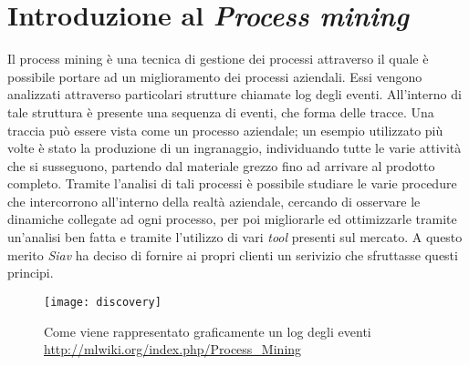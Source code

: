 \section{Introduzione al \textit{Process mining}}
Il process mining è una tecnica di gestione dei processi attraverso il quale è possibile portare ad un miglioramento dei processi aziendali. Essi vengono analizzati attraverso particolari strutture chiamate log degli eventi. All'interno di tale struttura è presente una sequenza di eventi, che forma delle tracce. Una traccia può essere vista come un processo aziendale; un esempio utilizzato più volte è stato la produzione di un ingranaggio, individuando tutte le varie attività che si susseguono, partendo dal materiale grezzo fino ad arrivare al prodotto completo. Tramite l'analisi di tali processi è possibile studiare le varie procedure che intercorrono all'interno della realtà aziendale, cercando di osservare le dinamiche collegate ad ogni processo, per poi migliorarle ed ottimizzarle tramite un'analisi ben fatta e tramite l'utilizzo di vari \textit{tool} presenti sul mercato. A questo merito \textit{Siav} ha deciso di fornire ai propri clienti un serivizio che sfruttasse questi principi.
\begin{figure}[!h] 
	\centering 
	\texttt{[image: discovery]} 
	\caption{Come viene rappresentato graficamente un log degli eventi \url{http://mlwiki.org/index.php/Process_Mining}}
\end{figure}
